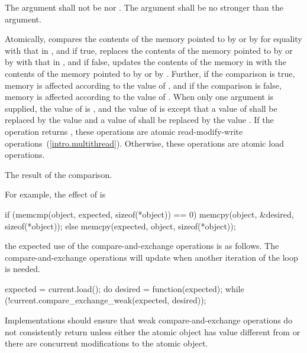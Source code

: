 \begin{itemdescr}
\pnum
\requires The  argument shall not be  nor
. The  argument shall be no stronger than the
 argument.

\pnum
\effects Atomically, compares the contents of the memory pointed to by  or by 
for equality with that in , and if true, replaces the contents of the memory pointed to
by  or by  with that in , and if false, updates the
contents of the memory in  with the contents of the memory pointed to by  or by
. Further, if the comparison is true, memory is affected according to the
value of , and if the comparison is false, memory is affected according
to the value of . When only one  argument is
supplied, the value of  is , and the value of
 is  except that a value of 
shall be replaced by the value  and a value of
 shall be replaced by the value
. If the operation returns , these
operations are atomic read-modify-write
operations~(\ref{intro.multithread}). Otherwise, these operations are atomic load operations.

\pnum
\returns The result of the comparison.

\pnum
\enternote For example, the effect of
 is
\begin{codeblock}
if (memcmp(object, expected, sizeof(*object)) == 0)
  memcpy(object, &desired, sizeof(*object));
else
  memcpy(expected, object, sizeof(*object));
\end{codeblock}
\exitnote
\enterexample the expected use of the compare-and-exchange operations is as follows. The
compare-and-exchange operations will update  when another iteration of
the loop is needed.
\begin{codeblock}
expected = current.load();
do {
  desired = function(expected);
} while (!current.compare_exchange_weak(expected, desired));
\end{codeblock}
\exitexample

\pnum
Implementations should ensure that weak compare-and-exchange operations do not
consistently return  unless either the atomic object has value
different from  or there are concurrent modifications to the
atomic object.


\end{itemdescr}
